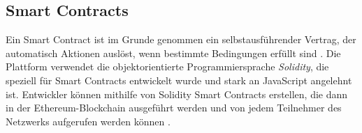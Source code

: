 \subsection{Smart Contracts}
\label{subsection:smart_contracts}

Ein Smart Contract ist im Grunde genommen ein selbstausführender Vertrag, der automatisch Aktionen auslöst, wenn bestimmte Bedingungen erfüllt sind \Parencite[S. 1-2]{Perez_SmartContractVulnerabilities}. Die Plattform verwendet die objektorientierte Programmiersprache \textit{Solidity}, die speziell für Smart Contracts entwickelt wurde und stark an JavaScript angelehnt ist. Entwickler können mithilfe von Solidity Smart Contracts erstellen, die dann in der Ethereum-Blockchain ausgeführt werden und von jedem Teilnehmer des Netzwerks aufgerufen werden können \Parencite[S. 127-133]{Antonopoulos_MasteringEthereum}.

